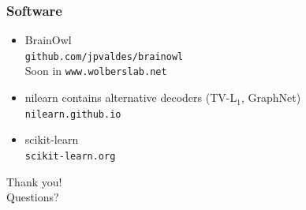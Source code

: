 \documentclass[11pt]{beamer}
\begin{document}
\begin{frame}
    \frametitle{Software}
    \begin{itemize}
        \item BrainOwl \\ \texttt{github.com/jpvaldes/brainowl}
            \\ Soon in \texttt{www.wolberslab.net}
        \item nilearn contains alternative decoders (TV-L$_1$, GraphNet) \\ 
            \texttt{nilearn.github.io}
        \item scikit-learn \\ \texttt{scikit-learn.org}
    \end{itemize}
\end{frame}

\begin{frame}[standout]
    Thank you! \\
    Questions?
\end{frame}
\end{document}
